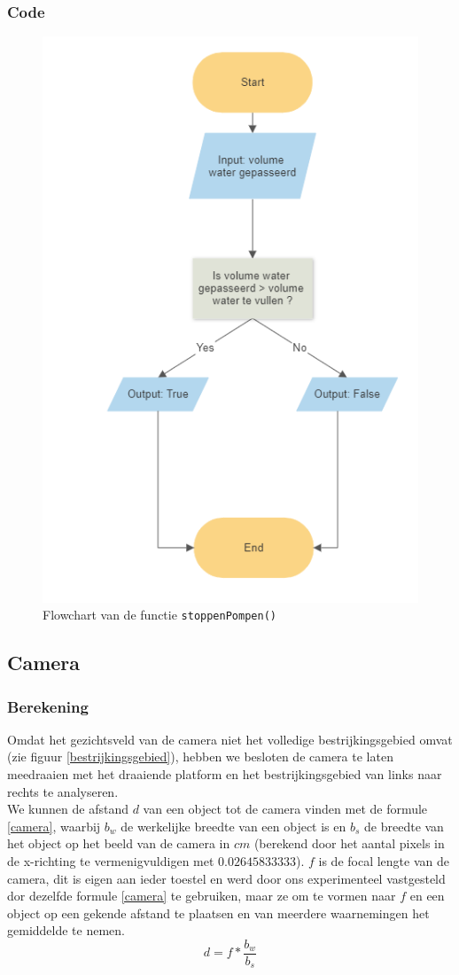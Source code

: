 \documentclass[kulak]{kulakarticle} %
\begin{document}
\subsubsection{Code}
\begin{figure} [!h]
	\centering                 
	\includegraphics[width = .3 \textwidth]{flowchart_stoppenPompen}
\cprotect\caption{Flowchart van de functie \verb|stoppenPompen()|}
\end{figure}





\subsection{Camera}
\subsubsection{Berekening}
Omdat het gezichtsveld van de camera niet het volledige bestrijkingsgebied omvat (zie figuur \ref{bestrijkingsgebied}), hebben we besloten de camera te laten meedraaien met het draaiende platform en het bestrijkingsgebied van links naar rechts te analyseren. \\

We kunnen de afstand \(d\) van een object tot de camera vinden met de formule \ref{camera}, waarbij \(b_w\) de werkelijke breedte van een object is en \(b_s\) de breedte van het object op het beeld van de camera in \(cm\) (berekend door het aantal pixels in de x-richting te vermenigvuldigen met \(0.02645833333\)). \(f\) is de focal lengte van de camera, dit is eigen aan ieder toestel en werd door ons experimenteel vastgesteld dor dezelfde formule \ref{camera} te gebruiken, maar ze om te vormen naar \(f\) en een object op een gekende afstand te plaatsen en van meerdere waarnemingen het gemiddelde te nemen. 
\begin{equation} \label{camera}
	d = f * \frac{b_w}{b_s}
\end{equation}
\end{document}
